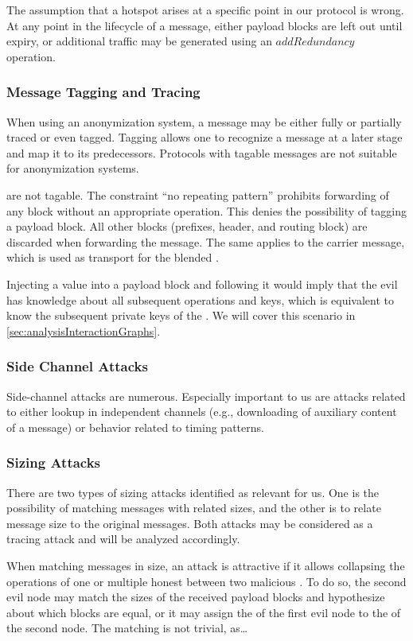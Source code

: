 The assumption that a hotspot arises at a specific point in our protocol is wrong. At any point in the lifecycle of a message, either payload blocks are left out until expiry, or additional traffic may be generated using an $addRedundancy$ operation.

\subsubsection{Message Tagging and Tracing}
When using an anonymization system, a message may be either fully or partially traced or even tagged. Tagging allows one to recognize a message at a later stage and map it to its predecessors. Protocols with tagable messages are not suitable for anonymization systems.

\VortexMessages{} are not tagable. The constraint ``no repeating pattern'' prohibits forwarding of any block without an appropriate operation. This denies the possibility of tagging a payload block. All other blocks (prefixes, header, and routing block) are discarded when forwarding the message. The same applies to the carrier message, which is used as transport for the blended \VortexMessage.

Injecting a value into a payload block and following it would imply that the evil \VortexNode{} has knowledge about all subsequent operations and keys, which is equivalent to know the subsequent private keys of the \VortexNodes. We will cover this scenario in \cref{sec:analysisInteractionGraphs}.

\subsubsection{Side Channel Attacks}
Side-channel attacks are numerous. Especially important to us are attacks related to either lookup in independent channels (e.g., downloading of auxiliary content of a message) or behavior related to timing patterns.

\subsubsection{Sizing Attacks}
There are two types of sizing attacks identified as relevant for us. One is the possibility of matching messages with related sizes, and the other is to relate message size to the original messages. Both attacks may be considered as a tracing attack and will be analyzed accordingly. 

When matching messages in size, an attack is attractive if it allows collapsing the operations of one or multiple honest \VortexNodes{} between two malicious \VortexNodes. To do so, the second evil node may match the sizes of the received payload blocks and hypothesize about which blocks are equal, or it may assign the  of the first evil node to the  of the second node. The matching is not trivial, as\ldots


